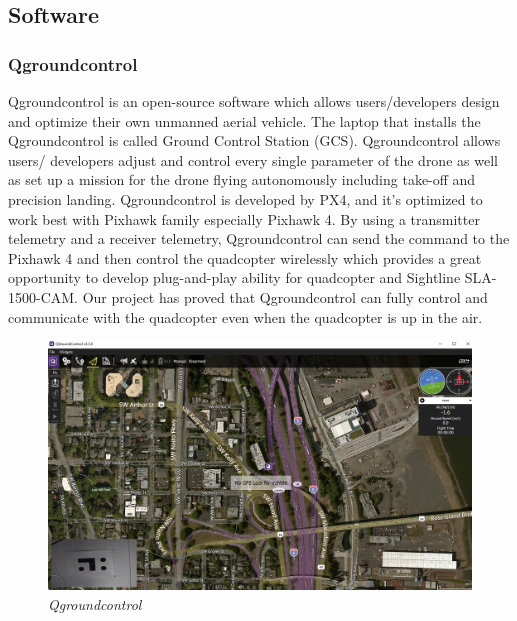 \documentclass[11pt]{article}
\begin{document}
\newpage



\subsection{Software}

\subsubsection{Qgroundcontrol}
Qgroundcontrol is an open-source software which allows users/developers design and optimize their own unmanned aerial vehicle. The laptop that installs the Qgroundcontrol is called Ground Control Station (GCS). Qgroundcontrol allows users/ developers adjust and control every single parameter of the drone as well as set up a mission for the drone flying autonomously including take-off and precision landing. Qgroundcontrol is developed by PX4, and it's optimized to work best with Pixhawk family especially Pixhawk 4. By using a transmitter telemetry and a receiver telemetry, Qgroundcontrol can send the command to the Pixhawk 4 and then control the quadcopter wirelessly which provides a great opportunity to develop  plug-and-play ability for quadcopter and Sightline SLA-1500-CAM. \newline
Our project has proved that Qgroundcontrol can fully control and communicate with the quadcopter even when the quadcopter is up in the air.  

\begin{figure}[h!bt]
\centering
\includegraphics[width=4.5 in]{Qgroundcontrol}
\caption{\textit{Qgroundcontrol}}	
\end{figure}
\end{document}
